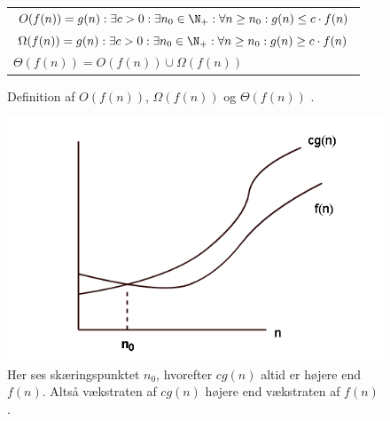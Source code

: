 
\begin{figure}
	\begin{center}
		\padtable
		\begin{tabular}{l}
			\hline
			$O(f(n)) = {g(n): \exists c > 0: \exists n_0 \in \N_+: \forall n \geq n_0: g(n) \leq c \cdot f(n)}$\\
			$\Omega (f(n)) = {g(n): \exists c > 0: \exists n_0 \in \N_+: \forall n \geq n_0: g(n) \geq c \cdot f(n)}$\\
			$\Theta (f(n)) = O(f(n)) \cup \Omega (f(n))$\\
			\hline
		\end{tabular}
	\end{center}
	\caption{Definition af $O(f(n))$, $\Omega (f(n))$ og $\Theta (f(n))$ \cite[s. 26]{aogd}.}
	\label{fig:Store-O definition}
\end{figure}

\begin{figure}
	\begin{center}
		\includegraphics[scale=0.5]{../img/Store-o og n0.png}
	\end{center}
	\caption{Her ses skæringspunktet $n_0$, hvorefter $cg(n)$ altid er højere end $f(n)$. Altså vækstraten af $cg(n)$ højere end vækstraten af $f(n)$ \cite{n0}.}
	\label{fig:Store-o og n2}
\end{figure}



